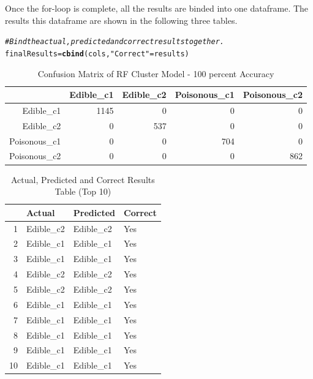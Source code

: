 \documentclass[10pt  ,usenames, dvipsnames]{article}\usepackage[]{graphicx}\usepackage[]{color}
\makeatletter
\newcommand{\hlstr}[1]{\textcolor[rgb]{0.192,0.494,0.8}{#1}}%
\newcommand{\hlcom}[1]{\textcolor[rgb]{0.678,0.584,0.686}{\textit{#1}}}%
\newcommand{\hlstd}[1]{\textcolor[rgb]{0.345,0.345,0.345}{#1}}%
\newcommand{\hlkwb}[1]{\textcolor[rgb]{0.69,0.353,0.396}{#1}}%
\newcommand{\hlkwd}[1]{\textcolor[rgb]{0.737,0.353,0.396}{\textbf{#1}}}%
\newenvironment{kframe}{%
 \def\at@end@of@kframe{}%
 \ifinner\ifhmode%
  \def\at@end@of@kframe{\end{minipage}}%
  \begin{minipage}{\columnwidth}%
 \fi\fi%
 \def\FrameCommand##1{\hskip\@totalleftmargin \hskip-\fboxsep
 \colorbox{shadecolor}{##1}\hskip-\fboxsep
     \hskip-\linewidth \hskip-\@totalleftmargin \hskip\columnwidth}%
 \MakeFramed {\advance\hsize-\width
   \@totalleftmargin\z@ \linewidth\hsize
   \@setminipage}}%
 {\par\unskip\endMakeFramed%
 \at@end@of@kframe}
\newenvironment{knitrout}{}{} %
\makeatother
\begin{document}
\clearpage

Once the for-loop is complete, all the results are binded into one dataframe. The results this dataframe are shown in the following three tables.

\begin{knitrout}
\color{fgcolor}\begin{kframe}
\begin{alltt}
\hlcom{#Bind the actual, predicted and correct results together.}
\hlstd{finalResults} \hlkwb{=} \hlkwd{cbind}\hlstd{(cols,} \hlstr{"Correct"} \hlstd{=results)}
\end{alltt}
\end{kframe}
\end{knitrout}






\begin{table}[ht]
\centering
\caption{Confusion Matrix of RF Cluster Model - 100 percent Accuracy}
\begin{tabular}{rrrrr}
  \hline
 & Edible\_c1 & Edible\_c2 & Poisonous\_c1 & Poisonous\_c2 \\ 
  \hline
Edible\_c1 & 1145 &   0 &   0 &   0 \\ 
  Edible\_c2 &   0 & 537 &   0 &   0 \\ 
  Poisonous\_c1 &   0 &   0 & 704 &   0 \\ 
  Poisonous\_c2 &   0 &   0 &   0 & 862 \\ 
   \hline
\end{tabular}
\label{tab1}
\end{table}




\begin{table}[ht]
\centering
\caption{Actual, Predicted and Correct Results Table (Top 10)}
\begin{tabular}{rlll}
  \hline
 & Actual & Predicted & Correct \\ 
  \hline
1 & Edible\_c2 & Edible\_c2 & Yes \\ 
  2 & Edible\_c1 & Edible\_c1 & Yes \\ 
  3 & Edible\_c1 & Edible\_c1 & Yes \\ 
  4 & Edible\_c2 & Edible\_c2 & Yes \\ 
  5 & Edible\_c2 & Edible\_c2 & Yes \\ 
  6 & Edible\_c1 & Edible\_c1 & Yes \\ 
  7 & Edible\_c1 & Edible\_c1 & Yes \\ 
  8 & Edible\_c1 & Edible\_c1 & Yes \\ 
  9 & Edible\_c1 & Edible\_c1 & Yes \\ 
  10 & Edible\_c1 & Edible\_c1 & Yes \\ 
   \hline
\end{tabular}
\label{tab2}
\end{table}
\end{document}
